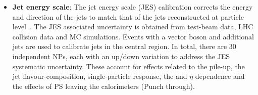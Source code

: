 \begin{itemize}
	\item \textbf{Jet energy scale}: The jet energy scale (JES) calibration corrects the energy and direction 
		of the jets to match that of the jets reconstructed at particle level~\cite{ATLAS:2020cli}. 
		The JES associated uncertainty is obtained from test-beam data, LHC collision data
		and MC simulations. Events with a vector boson and additional jets are used to calibrate 
		jets in the central region. %
		In total, there are 30 independent NPs, each with an up/down variation
		to address the JES systematic uncertainty. These account for effects related to the pile-up, 
		the jet flavour-composition, single-particle response, the \pT and $\eta$ dependence and the
		effects of PS leaving the calorimeters (Punch through).
		\begin{comment}
		\begin{itemize}
			\item EffectiveNP\_Statistical
			\item EffectiveNP\_Modelling
			\item EffectiveNP\_Detector
			\item EffectiveNP\_Mixed
			\item EtaIntercalibration\_Modelling
			\item EtaIntercalibration\_NonClosure\_highE, EtaIntercalibration\_NonClosure\_posEta 
				and EtaIntercalibration\_NonClosure\_negEta
			\item EtaIntercalibration\_TotalStat
			\item Pileup\_OffsetMu, Pileup\_OffsetNPV, Pileup\_PtTerm and Pileup\_RhoTopology
			\item SingleParticle\_HighPt
			\item Flavor\_Response, Flavor\_Composition, BJES\_Response
			\item RelativeNonClosure\_AFII
			\item PunchThrough: The punch-through is a phenomena  that takes place
			when the PS are elongated enough to leave the calorimeter and causing a
			leakage into the MS.  The particles entering the MS are called punch-through particles.
		\end{itemize}	
		\end{comment}
		

\end{itemize}
